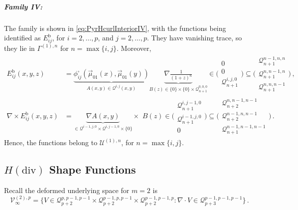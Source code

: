 \subparagraph{Family IV:}
The family is shown in \eqref{eq:PyrHcurlInteriorIV}, with the functions being identified as $E_{ij}^{\mathrm{b}}$, for $i=2,\ldots,p$, and $j=2,\ldots,p$.
They have vanishing trace, so they lie in $\Gamma^{(1),n}$ for $n=\max\{i,j\}$.
Moreover,
\begin{equation}
\begin{aligned}
	E_{ij}^\mathrm{b}(x,y,z)&=
		\underbrace{\phi_{ij}^\square(\vec{\mu}_{01}(x),\vec{\mu}_{01}(y))}_{A(x,y)\in\mathcal{Q}^{i,j}(x,y)}
			\underbrace{\nabla\textstyle{\frac{1}{(1+z)^n}}}_{B(z)\in\{0\}\!\times\!\{0\}\!\times\!\mathcal{Q}_{n+1}^{0,0,0}}
				\!\in\!\Bigg(\begin{smallmatrix}0\\[2pt]0\\[2pt]\mathcal{Q}_{n+1}^{i,j,0}\end{smallmatrix}\Bigg)
					\subseteq\Bigg(\begin{smallmatrix}\mathcal{Q}_{n+1}^{n-1,n,n}\\[2pt]\mathcal{Q}_{n+1}^{n,n-1,n}\\[2pt]
						\mathcal{Q}_{n+1}^{n,n,n-1}\end{smallmatrix}\Bigg)\,,\\
	\nabla\!\times\! E_{ij}^\mathrm{b}(x,y,z)&=
		\underbrace{\nabla A(x,y)}_{\in\mathcal{Q}^{i-1,j,0}\!\times\!\mathcal{Q}^{i,j-1,0}\!\times\!\{0\}}\!\!\!\!\!\!\times\,\,B(z)
			\!\in\!\Bigg(\begin{smallmatrix}\mathcal{Q}_{n+1}^{i,j-1,0}\\[2pt]\mathcal{Q}_{n+1}^{i-1,j,0}\\[2pt]0\end{smallmatrix}\Bigg)
				\subseteq\Bigg(\begin{smallmatrix}\mathcal{Q}_{n+2}^{n,n-1,n-1}\\[2pt]\mathcal{Q}_{n+2}^{n-1,n,n-1}\\[2pt]
					\mathcal{Q}_{n+1}^{n-1,n-1,n-1}\end{smallmatrix}\Bigg)\,.
\end{aligned}
\label{eq:PyrHcurlInteriorIVProof}
\end{equation}
Hence, the functions belong to $\mathcal{U}^{(1),n}$, for $n=\max\{i,j\}$.

\subsection{\texorpdfstring{$H(\mathrm{div})$}{Hdiv} Shape Functions}

Recall the deformed underlying space for $m=2$ is
\begin{equation*}
	\mathcal{V}_\infty^{(2),p}=\{V\!\in\!
		\mathcal{Q}_{p+2}^{p,p-1,p-1}\!\times\!\mathcal{Q}_{p+2}^{p-1,p,p-1}\!\times\!\mathcal{Q}_{p+2}^{p-1,p-1,p}:
			\nabla\cdot V\!\in\!\mathcal{Q}_{p+3}^{p-1,p-1,p-1}\}\,.
\end{equation*}

